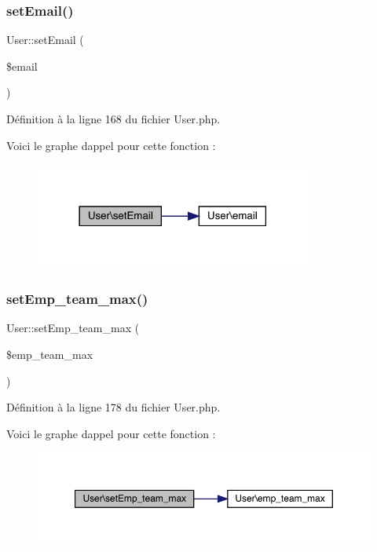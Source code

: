 \subsubsection{\texorpdfstring{set\+Email()}{setEmail()}}
{\footnotesize\ttfamily User\+::set\+Email (\begin{DoxyParamCaption}\item[{}]{\$email }\end{DoxyParamCaption})}



Définition à la ligne 168 du fichier User.\+php.

Voici le graphe d\textquotesingle{}appel pour cette fonction \+:\nopagebreak
\begin{figure}[H]
\begin{center}
\leavevmode
\includegraphics[width=258pt]{class_user_a018ae17e436e09134922835cdd3235a7_cgraph}
\end{center}
\end{figure}
\mbox{\label{class_user_a35862bf973a7ba7c0d3b84e834156e10}} 
\subsubsection{\texorpdfstring{set\+Emp\+\_\+team\+\_\+max()}{setEmp\_team\_max()}}
{\footnotesize\ttfamily User\+::set\+Emp\+\_\+team\+\_\+max (\begin{DoxyParamCaption}\item[{}]{\$emp\+\_\+team\+\_\+max }\end{DoxyParamCaption})}



Définition à la ligne 178 du fichier User.\+php.

Voici le graphe d\textquotesingle{}appel pour cette fonction \+:\nopagebreak
\begin{figure}[H]
\begin{center}
\leavevmode
\includegraphics[width=350pt]{class_user_a35862bf973a7ba7c0d3b84e834156e10_cgraph}
\end{center}
\end{figure}
\mbox{\label{class_user_a08df42bf36aae3eb166e208ad689c814}} 
